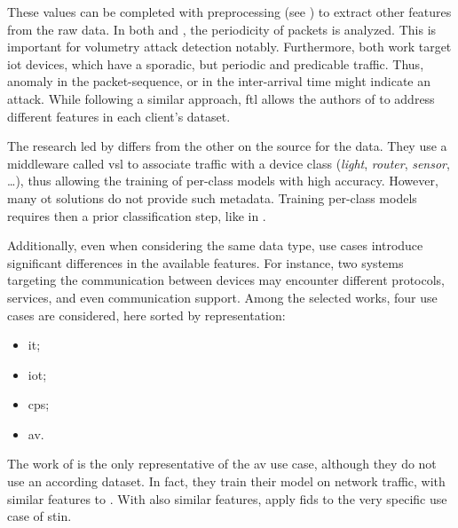 These values can be completed with preprocessing (see ) to extract other features from the raw data.
In both \cite{pahl_AllEyesYou_2018} and \cite{nguyen_DIoTFederatedSelflearning_2019}, the periodicity of packets is analyzed.
This is important for volumetry attack detection notably.
Furthermore, both work target \gls{iot} devices, which have a sporadic, but periodic and predicable traffic.
Thus, anomaly in the packet-sequence, or in the inter-arrival time might indicate an attack.
While following a similar approach, \gls{ftl} allows the authors of \cite{fan_IoTDefenderFederatedTransfer_2020} to address different features in each client's dataset.


The research led by \textcite{pahl_AllEyesYou_2018} differs from the other on the source for the data.
They use a middleware called \gls{vsl} to associate traffic with a device class (\emph{light}, \emph{router}, \emph{sensor}, \dots), thus allowing the training of per-class models with high accuracy.
However, many \gls{ot} solutions do not provide such metadata.
Training per-class models requires then a prior classification step, like in \cite{nguyen_DIoTFederatedSelflearning_2019}.

Additionally, even when considering the same data type, use cases introduce significant differences in the available features.
For instance, two systems targeting the communication between devices may encounter different protocols, services, and even communication support.
Among the selected works, four use cases are considered, here sorted by representation:
\begin{itemize}
    \item \acrfull{it};
    \item \acrfull{iot};
    \item \acrfull{cps};
    \item \acrfull{av}.
\end{itemize}

The work of \textcite{liu_BlockchainFederatedLearning_2021} is the only representative of the \gls{av} use case, although they do not use an according dataset.
In fact, they train their model on network traffic, with similar features to \cite{rahman_InternetThingsIntrusion_2020,chen_Networkanomalydetection_2020,rathore_BlockSecIoTNetBlockchainbaseddecentralized_2019,fan_IoTDefenderFederatedTransfer_2020}.
With also similar features, \textcite{li_DeepFedFederatedDeep_2020b} apply \gls{fids} to the very specific use case of \gls{stin}.

